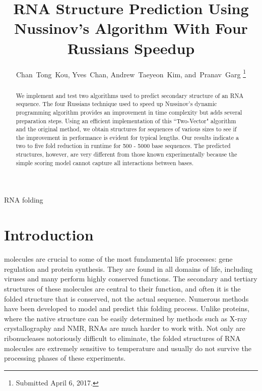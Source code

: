 \documentclass[journal]{IEEEtran}
\author{Chan~Tong~Kou,
Yves~Chan,
Andrew~Taeyeon~Kim,
and~Pranav~Garg%
\thanks{Submitted April 6, 2017.}
}
\title{RNA Structure Prediction Using Nussinov's Algorithm With Four Russians Speedup}
\begin{document}
%
{RNA folding}
\maketitle
\begin{abstract}
We implement and test two algorithms used to predict secondary structure of an RNA sequence. The four Russians technique used to speed up Nussinov's dynamic programming algorithm provides an improvement in time complexity but adds several preparation steps. Using an efficient implementation of this ``Two-Vector" algorithm and the original method, we obtain structures for sequences of various sizes to see if the improvement in performance is evident for typical lengths. Our results indicate a two to five fold reduction in runtime for 500 - 5000 base sequences. The predicted structures, however, are very different from those known experimentally because the simple scoring model cannot capture all interactions between bases.
\end{abstract}

\section{Introduction}
 molecules are crucial to some of the most fundamental life processes: gene regulation and protein synthesis. They are found in all domains of life, including viruses and many perform highly conserved functions. The secondary and tertiary structures of these molecules are central to their function, and often it is the folded structure that is conserved, not the actual sequence. Numerous methods have been developed to model and predict this folding process. Unlike proteins, where the native structure can be easily determined by methods such as X-ray crystallography and NMR, RNAs are much harder to work with. Not only are ribonucleases notoriously difficult to eliminate, the folded structures of RNA molecules are extremely sensitive to temperature and usually do not survive the processing phases of these experiments.
\end{document}

